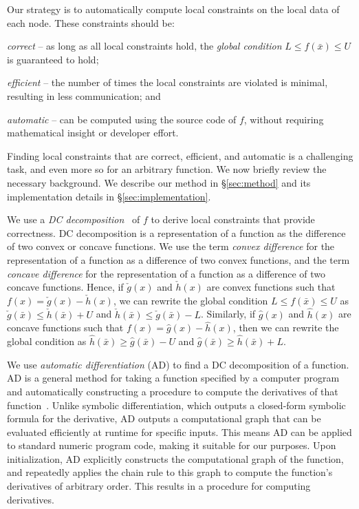Our strategy is to automatically compute local constraints on the local data of each node.
These constraints should be: 
\begin{enumerate*}
    \item \emph{correct} -- as long as all local constraints hold, the \emph{global condition} $L \le f(\bar{x}) \le U$ is guaranteed to hold; 
 \item \emph{efficient} -- the number of times the local constraints are violated is minimal, resulting in less communication; and
 \item \emph{automatic} -- can be computed using the source code of $f$, without requiring mathematical insight or developer effort.
\end{enumerate*}

Finding local constraints that are correct, efficient, and automatic is a challenging task, and even more so for an arbitrary function.
We now briefly review the necessary background. We describe our method in \S\ref{sec:method} and its implementation details in \S\ref{sec:implementation}.


%
We use a \emph{DC decomposition}~\cite{dc_Decomposition} of $f$ to derive local constraints that provide correctness.
%
DC decomposition is a representation of a function as the difference of two convex or concave functions.
We use the term \emph{convex difference} for the representation of a function as a difference of two convex functions, and the term \emph{concave difference} for the representation of a function as a difference of two concave functions.
Hence, if $\check{g}(x)$ and $\check{h}(x)$ are convex functions such that $f(x) = \check{g}(x) - \check{h}(x)$, we can rewrite the global condition $L \le f(\bar{x}) \le U$ as
$\check{g}(\bar{x}) \le \check{h}(\bar{x}) + U$ and $\check{h}(\bar{x}) \le \check{g}(\bar{x}) - L$.
Similarly, if $\hat{g}(x)$ and $\hat{h}(x)$ are concave functions such that $f(x) = \hat{g}(x) - \hat{h}(x)$, then we can rewrite the global condition as
$\hat{h}(\bar{x}) \ge \hat{g}(\bar{x}) - U$ and $\hat{g}(\bar{x}) \ge \hat{h}(\bar{x}) + L$.

We use \emph{automatic differentiation} (AD) to find a DC decomposition of a function.
AD is a general method for taking a function specified by a computer program and automatically constructing a procedure to compute the derivatives of that function~\cite{survey_on_automatic_differentiation}.
Unlike symbolic differentiation, which outputs a closed-form symbolic formula for the derivative, AD outputs a computational graph that can be evaluated efficiently at runtime for specific inputs.
This means AD can be applied to standard numeric program code, making it suitable for our purposes.
Upon initialization, AD explicitly constructs the computational graph of the function, and repeatedly applies the chain rule to this graph to compute the function's derivatives of arbitrary order.
This results in a procedure for computing derivatives.



